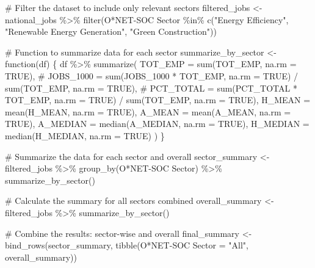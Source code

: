 \documentclass[
  letterpaper,
  DIV=11,
  numbers=noendperiod]{scrartcl}
\newenvironment{Shaded}{\begin{snugshade}}{\end{snugshade}}
\newcommand{\AttributeTok}[1]{\textcolor[rgb]{0.40,0.45,0.13}{#1}}
\newcommand{\CommentTok}[1]{\textcolor[rgb]{0.37,0.37,0.37}{#1}}
\newcommand{\ConstantTok}[1]{\textcolor[rgb]{0.56,0.35,0.01}{#1}}
\newcommand{\ControlFlowTok}[1]{\textcolor[rgb]{0.00,0.23,0.31}{#1}}
\newcommand{\FunctionTok}[1]{\textcolor[rgb]{0.28,0.35,0.67}{#1}}
\newcommand{\NormalTok}[1]{\textcolor[rgb]{0.00,0.23,0.31}{#1}}
\newcommand{\OtherTok}[1]{\textcolor[rgb]{0.00,0.23,0.31}{#1}}
\newcommand{\SpecialCharTok}[1]{\textcolor[rgb]{0.37,0.37,0.37}{#1}}
\newcommand{\StringTok}[1]{\textcolor[rgb]{0.13,0.47,0.30}{#1}}
\begin{document}
\begin{Shaded}
\begin{Highlighting}[]
\CommentTok{\# Filter the dataset to include only relevant sectors}
\NormalTok{filtered\_jobs }\OtherTok{\textless{}{-}}\NormalTok{ national\_jobs }\SpecialCharTok{\%\textgreater{}\%}
  \FunctionTok{filter}\NormalTok{(}\StringTok{\textasciigrave{}}\AttributeTok{O*NET{-}SOC Sector}\StringTok{\textasciigrave{}} \SpecialCharTok{\%in\%} \FunctionTok{c}\NormalTok{(}\StringTok{"Energy Efficiency"}\NormalTok{, }\StringTok{"Renewable Energy Generation"}\NormalTok{, }\StringTok{"Green Construction"}\NormalTok{))}

\CommentTok{\# Function to summarize data for each sector}
\NormalTok{summarize\_by\_sector }\OtherTok{\textless{}{-}} \ControlFlowTok{function}\NormalTok{(df) \{}
\NormalTok{  df }\SpecialCharTok{\%\textgreater{}\%}
    \FunctionTok{summarize}\NormalTok{(}
      \AttributeTok{TOT\_EMP =} \FunctionTok{sum}\NormalTok{(TOT\_EMP, }\AttributeTok{na.rm =} \ConstantTok{TRUE}\NormalTok{),}
      \CommentTok{\# JOBS\_1000 = sum(JOBS\_1000 * TOT\_EMP, na.rm = TRUE) / sum(TOT\_EMP, na.rm = TRUE),}
      \CommentTok{\# PCT\_TOTAL = sum(PCT\_TOTAL * TOT\_EMP, na.rm = TRUE) / sum(TOT\_EMP, na.rm = TRUE),}
      \AttributeTok{H\_MEAN =} \FunctionTok{mean}\NormalTok{(H\_MEAN, }\AttributeTok{na.rm =} \ConstantTok{TRUE}\NormalTok{),}
      \AttributeTok{A\_MEAN =} \FunctionTok{mean}\NormalTok{(A\_MEAN, }\AttributeTok{na.rm =} \ConstantTok{TRUE}\NormalTok{),}
      \AttributeTok{A\_MEDIAN =} \FunctionTok{median}\NormalTok{(A\_MEDIAN, }\AttributeTok{na.rm =} \ConstantTok{TRUE}\NormalTok{),}
      \AttributeTok{H\_MEDIAN =} \FunctionTok{median}\NormalTok{(H\_MEDIAN, }\AttributeTok{na.rm =} \ConstantTok{TRUE}\NormalTok{)}
\NormalTok{    )}
\NormalTok{\}}

\CommentTok{\# Summarize the data for each sector and overall}
\NormalTok{sector\_summary }\OtherTok{\textless{}{-}}\NormalTok{ filtered\_jobs }\SpecialCharTok{\%\textgreater{}\%}
  \FunctionTok{group\_by}\NormalTok{(}\StringTok{\textasciigrave{}}\AttributeTok{O*NET{-}SOC Sector}\StringTok{\textasciigrave{}}\NormalTok{) }\SpecialCharTok{\%\textgreater{}\%}
  \FunctionTok{summarize\_by\_sector}\NormalTok{()}

\CommentTok{\# Calculate the summary for all sectors combined}
\NormalTok{overall\_summary }\OtherTok{\textless{}{-}}\NormalTok{ filtered\_jobs }\SpecialCharTok{\%\textgreater{}\%}
  \FunctionTok{summarize\_by\_sector}\NormalTok{()}

\CommentTok{\# Combine the results: sector{-}wise and overall}
\NormalTok{final\_summary }\OtherTok{\textless{}{-}} \FunctionTok{bind\_rows}\NormalTok{(sector\_summary, }\FunctionTok{tibble}\NormalTok{(}\StringTok{\textasciigrave{}}\AttributeTok{O*NET{-}SOC Sector}\StringTok{\textasciigrave{}} \OtherTok{=} \StringTok{"All"}\NormalTok{, overall\_summary))}


\end{Highlighting}
\end{Shaded}
\end{document}
